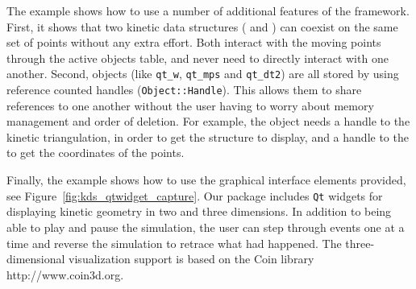 The example shows how to use a number of additional features of the
framework. First, it shows that two kinetic data structures
( and
) can coexist on the same set of
points without any extra effort. Both interact with the moving points
through the active objects table, and never need to directly interact
with one another. Second, objects (like
\texttt{qt\_w}, \texttt{qt\_mps} and \texttt{qt\_dt2}) are all stored
by using reference counted handles (\texttt{Object::Handle}). This
allows them to share references to one another without the user having
to worry about memory management and order of deletion.  For example,
the  object needs a handle to the kinetic
triangulation, in order to get the structure to display, and a handle
to the  to get the coordinates of the
points.


Finally, the example shows how to use the graphical interface elements
provided, see Figure~\ref{fig:kds_qtwidget_capture}. Our package includes
\texttt{Qt} widgets for displaying kinetic geometry in two and three
dimensions. In addition to being able to play and pause the
simulation, the user can step through events one at a time and reverse
the simulation to retrace what had happened. The three-dimensional
visualization support is based on the Coin library http://www.coin3d.org.

